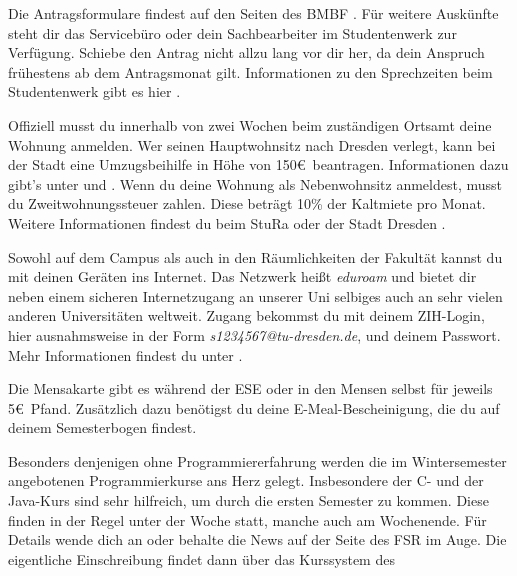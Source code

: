 \begin{itemize}[leftmargin=*]
Die Antragsformulare findest auf den Seiten des BMBF . Für weitere Auskünfte steht dir das Servicebüro oder dein Sachbearbeiter im Studentenwerk zur Verfügung.
Schiebe den Antrag nicht allzu lang vor dir her, da dein Anspruch frühestens ab dem Antragsmonat gilt.
Informationen zu den Sprechzeiten beim Studentenwerk gibt es hier .

\newpage

Offiziell musst du innerhalb von zwei Wochen beim zuständigen Ortsamt  deine Wohnung anmelden.
Wer seinen Hauptwohnsitz nach Dresden verlegt, kann bei der Stadt eine \glqq{}Umzugsbeihilfe\grqq{} in Höhe von 150\euro\ beantragen.
Informationen dazu gibt's unter  und .
Wenn du deine Wohnung als Nebenwohnsitz anmeldest, musst du Zweitwohnungssteuer zahlen. Diese beträgt 10\% der Kaltmiete pro Monat. Weitere Informationen findest du beim StuRa  oder der Stadt Dresden .

Sowohl auf dem Campus als auch in den Räumlichkeiten der Fakultät kannst du mit deinen Geräten ins Internet.
Das Netzwerk heißt \textit{eduroam} und bietet dir neben einem sicheren Internetzugang an unserer Uni selbiges auch an sehr vielen anderen Universitäten weltweit.
Zugang bekommst du mit deinem ZIH-Login, hier ausnahmsweise in der Form \textit{s1234567@tu-dresden.de}, und deinem Passwort. Mehr Informationen findest du unter .

Die Mensakarte gibt es während der ESE oder in den Mensen selbst für jeweils 5\euro\ Pfand.
Zusätzlich dazu benötigst du deine E-Meal-Bescheinigung, die du auf deinem Semesterbogen findest.

Besonders denjenigen ohne Programmiererfahrung werden die im Wintersemester angebotenen Programmierkurse ans Herz gelegt. Insbesondere der C- und der Java-Kurs sind sehr hilfreich, um durch die ersten Semester zu kommen.
Diese finden in der Regel unter der Woche statt, manche auch am Wochenende.
Für Details wende dich an  oder behalte die News auf der Seite des FSR  im Auge.
Die eigentliche Einschreibung findet dann über das Kurssystem des


\end{itemize}
